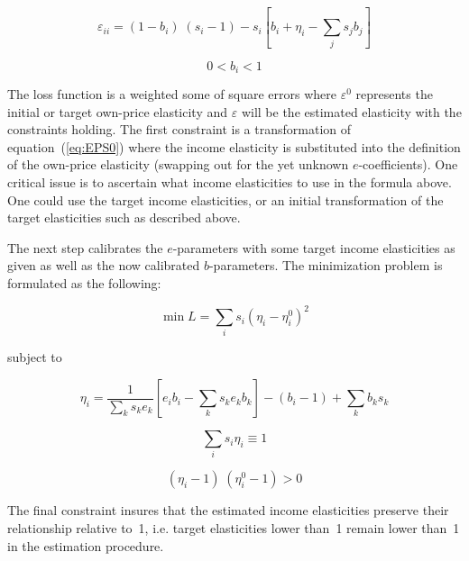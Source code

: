 \begin{displaymath}
{\varepsilon_{ii}} = (1 - {b_i})\;({s_i} - 1) - {s_i}\left[ {{b_i} + {\eta_i}
- \sum\limits_j {{s_j}{b_j}} } \right]
\end{displaymath}

\begin{displaymath}
0 < {b_i} < 1
\end{displaymath}

The loss function is a weighted some of square errors where $\varepsilon^0$ represents the
initial or target own-price elasticity and $\varepsilon$ will be the estimated elasticity with
the constraints holding. The first constraint is a transformation of equation~(\ref{eq:EPS0})
where the income elasticity is substituted into the definition of the own-price elasticity
(swapping out for the yet unknown $e$-coefficients). One critical issue is to ascertain what
income elasticities to use in the formula above. One could use the target income elasticities,
or an initial transformation of the target elasticities such as described above.

The next step calibrates the $e$-parameters with some target income elasticities as given as well
as the now calibrated $b$-parameters. The minimization problem is formulated as the following:

\begin{displaymath}
\min L = \sum\limits_i {{s_i}{{({\eta_i} - \eta_i^0)}^2}}
\end{displaymath}

\noindent subject to

\begin{displaymath}
{\eta_i} = \frac{1}{{\sum\limits_k {{s_k}} {e_k}}}\left[ {{e_i}{b_i}
- \sum\limits_k {{s_k}} {e_k}{b_k}} \right] - ({b_i} - 1) + \sum\limits_k {{b_k}{s_k}}
\end{displaymath}

\begin{displaymath}
\sum\limits_i {{s_i}{\eta_i}}  \equiv 1
\end{displaymath}

\begin{displaymath}
\left( {{\eta_i} - 1} \right)\;\left( {\eta_i^0 - 1} \right) > 0
\end{displaymath}

The final constraint insures that the estimated income elasticities preserve their relationship
relative to~1, i.e. target elasticities lower than~1 remain lower than~1 in the
estimation procedure.

